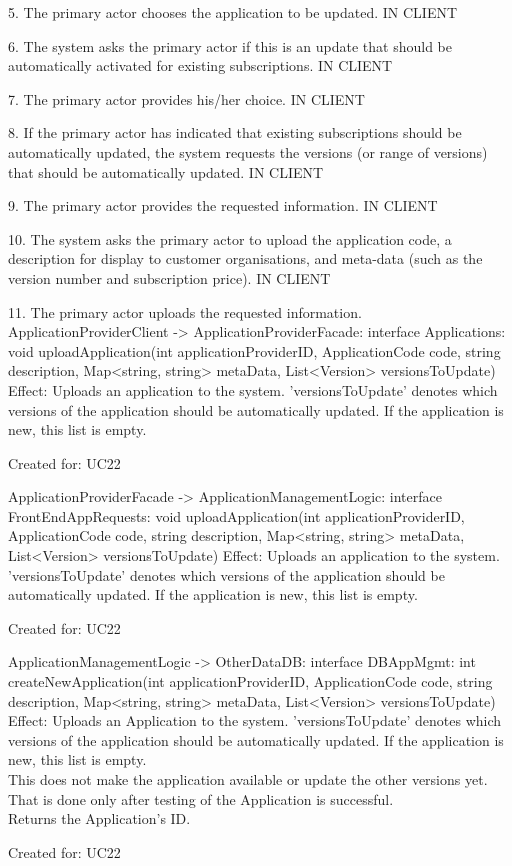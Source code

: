         5. The primary actor chooses the application to be updated.
            IN CLIENT

        6. The system asks the primary actor if this is an update that should be automatically activated for existing subscriptions.
            IN CLIENT

        7. The primary actor provides his/her choice.
            IN CLIENT

        8. If the primary actor has indicated that existing subscriptions should be automatically updated, the system requests the versions (or range of versions) that should be automatically updated.
            IN CLIENT

        9. The primary actor provides the requested information.
            IN CLIENT

        10. The system asks the primary actor to upload the application code, a description for display to customer organisations, and meta-data (such as the version number and subscription price).
            IN CLIENT

        11. The primary actor uploads the requested information.
            ApplicationProviderClient -> ApplicationProviderFacade: interface Applications: void uploadApplication(int applicationProviderID, ApplicationCode code, string description, Map<string, string> metaData, List<Version> versionsToUpdate)
                Effect: Uploads an application to the system. 'versionsToUpdate' denotes which versions of the application should be automatically updated. If the application is new, this list is empty.
                \item Created for: UC22

            ApplicationProviderFacade -> ApplicationManagementLogic: interface FrontEndAppRequests: void uploadApplication(int applicationProviderID, ApplicationCode code, string description, Map<string, string> metaData, List<Version> versionsToUpdate)
                Effect: Uploads an application to the system. 'versionsToUpdate' denotes which versions of the application should be automatically updated. If the application is new, this list is empty.
                \item Created for: UC22

            ApplicationManagementLogic -> OtherDataDB: interface DBAppMgmt: int createNewApplication(int applicationProviderID, ApplicationCode code, string description, Map<string, string> metaData, List<Version> versionsToUpdate)
                Effect: Uploads an Application to the system. 'versionsToUpdate' denotes which versions of the application should be automatically updated. If the application is new, this list is empty. \\
                        This does not make the application available or update the other versions yet. That is done only after testing of the Application is successful. \\
                        Returns the Application's ID.
                \item Created for: UC22

